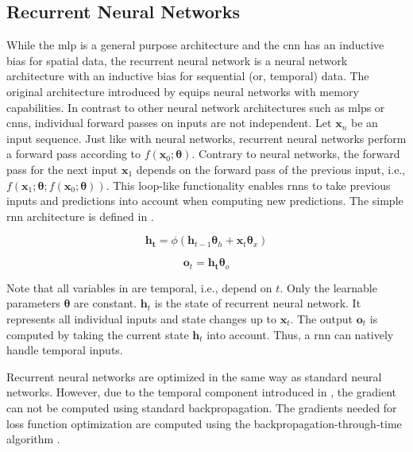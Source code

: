 \subsection{Recurrent Neural Networks}
\label{subsec:bg.rnn}

While the \gls{mlp} is a general purpose architecture and the \gls{cnn} has an inductive bias for spatial data, the recurrent neural network is a neural network architecture with an inductive bias for sequential (or, temporal) data. The original architecture introduced by \citet{Rumelhart1986} equips neural networks with memory capabilities. In contrast to other neural network architectures such as \glspl{mlp} or \glspl{cnn}, individual forward passes on inputs are not independent. Let $\mathbf{x}_n$ be an input sequence. Just like with neural networks, recurrent neural networks perform a forward pass according to $f(\mathbf{x}_0; \boldsymbol{\theta})$. Contrary to neural networks, the forward pass for the next input $\mathbf{x}_1$ depends on the forward pass of the previous input, i.e., $f(\mathbf{x}_1;\boldsymbol{\theta};f(\mathbf{x}_0; \boldsymbol{\theta}))$. This loop-like functionality enables \glspl{rnn} to take previous inputs and predictions into account when computing new predictions. The simple \gls{rnn} architecture is defined in .

\begin{equation}
\label{eq:vanillarnn.h}
        \mathbf{h_t} = \phi(\mathbf{h}_{t-1} \boldsymbol{\theta}_h + \mathbf{x}_t \boldsymbol{\theta}_x)
\end{equation}

\begin{equation}
\label{eq:vanillarnn.o}
        \mathbf{o}_t = \mathbf{h_t} \boldsymbol{\theta}_o
\end{equation}

Note that all variables in  are temporal, i.e., depend on $t$. Only the learnable parameters $\boldsymbol{\theta}$ are constant. $\mathbf{h}_t$ is the state of recurrent neural network. It represents all individual inputs and state changes up to  $\mathbf{x}_t$. The output $\mathbf{o}_t$ is computed by taking the current state $\mathbf{h}_t$ into account. Thus, a \gls{rnn} can natively handle temporal inputs.

Recurrent neural networks are optimized in the same way as standard neural networks. However, due to the temporal component introduced in , the gradient can not be computed using standard backpropagation. The gradients needed for loss function optimization are computed using the backpropagation-through-time algorithm \citep{robinson:utility}.

